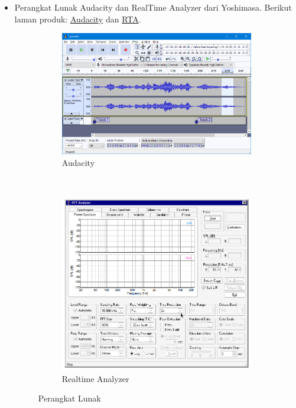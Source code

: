 \documentclass{article}
\begin{document}
\begin{itemize}
		\newpage
		\item Perangkat Lunak Audacity dan RealTime Analyzer dari Yoshimasa.
		Berikut laman produk: \href{https://www.audacityteam.org/}{Audacity} dan \href{http://www.ymec.com/products/dssf3e/}{RTA}.

		\begin{figure}[H]
			\centering
			\begin{subfigure}[]{.55\textwidth}
				\includegraphics[width=\textwidth]{images/audacity}
				\caption{Audacity}
			\end{subfigure}
			\\
			\begin{subfigure}[]{.55\textwidth}
				\includegraphics[width=\textwidth]{images/rta}
				\caption{Realtime Analyzer}
			\end{subfigure}
			\caption{Perangkat Lunak}
		\end{figure}

	\end{itemize}
\end{document}
